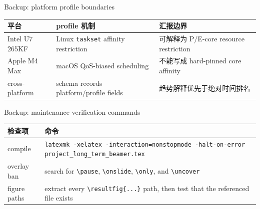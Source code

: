 \documentclass[UTF8,aspectratio=169,10pt]{ctexbeamer}
\newcommand{\code}[1]{\texttt{#1}}
\begin{document}
\begin{frame}{Backup: platform profile boundaries}
\begin{center}
\begin{tabularx}{0.94\textwidth}{lXX}
\toprule
平台 & profile 机制 & 汇报边界 \\
\midrule
Intel U7 265KF & Linux \code{taskset} affinity restriction & 可解释为 P/E-core resource restriction \\
Apple M4 Max & macOS QoS-biased scheduling & 不能写成 hard-pinned core affinity \\
cross-platform & schema records platform/profile fields & 趋势解释优先于绝对时间排名 \\
\bottomrule
\end{tabularx}
\end{center}
\end{frame}

\begin{frame}{Backup: maintenance verification commands}
\begin{center}
\begin{tabularx}{0.94\textwidth}{lX}
\toprule
检查项 & 命令 \\
\midrule
compile & \code{latexmk -xelatex -interaction=nonstopmode -halt-on-error project\_long\_term\_beamer.tex} \\
overlay ban & search for \code{\textbackslash pause}, \code{\textbackslash onslide}, \code{\textbackslash only}, and \code{\textbackslash uncover} \\
figure paths & extract every \code{\textbackslash resultfig\{...\}} path, then test that the referenced file exists \\
\bottomrule
\end{tabularx}
\end{center}
\end{frame}
\end{document}
